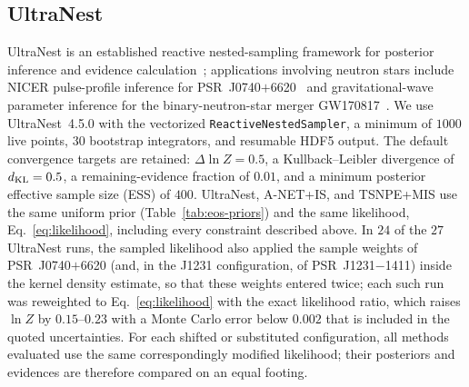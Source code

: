 \documentclass[aps,prd,twocolumn,superscriptaddress,nofootinbib,longbibliography]{revtex4-2}
\begin{document}
\subsection{UltraNest}
\label{sec:method:ultranest}
UltraNest is an established reactive nested-sampling framework
for posterior inference and evidence
calculation~\cite{Skilling:2006gxv,Buchner:2021cql};
applications involving neutron stars include NICER
pulse-profile inference for PSR~J0740$+$6620~\cite{Hoogkamer:2025ype} and
gravitational-wave parameter inference for the binary-neutron-star merger
GW170817~\cite{Buchner:2024rjd}. We use
UltraNest~4.5.0 with the vectorized \texttt{ReactiveNestedSampler}, a minimum of
$1000$ live points, $30$ bootstrap integrators, and resumable HDF5 output. The
default convergence targets are retained: $\Delta\ln Z=0.5$, a
Kullback--Leibler divergence of $d_{\rm KL}=0.5$, a remaining-evidence
fraction of $0.01$, and a minimum posterior
effective sample size (ESS) of $400$.
UltraNest, A-NET+IS, and TSNPE+MIS use the same uniform
prior (Table~\ref{tab:eos-priors}) and the same likelihood,
Eq.~\eqref{eq:likelihood}, including every constraint described above. In $24$
of the $27$ UltraNest runs, the sampled likelihood also applied the sample weights
of PSR~J0740$+$6620 (and, in the J1231 configuration, of PSR~J1231$-$1411) inside
the kernel density estimate, so that these weights entered twice; each such run
was reweighted to Eq.~\eqref{eq:likelihood} with the exact likelihood ratio,
which raises $\ln Z$ by $0.15$--$0.23$ with a Monte Carlo error below $0.002$
that is included in the quoted uncertainties. For each
shifted or substituted configuration, all methods evaluated use the same
correspondingly modified likelihood; their posteriors and evidences are
therefore compared on an equal footing.
\end{document}
